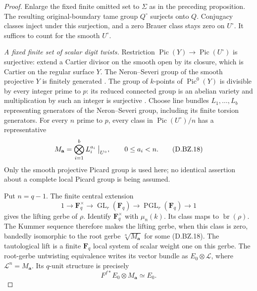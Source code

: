 \begin{proof}
Enlarge the fixed finite omitted set to $\Sigma$
as in the preceding proposition.  The resulting
original-boundary tame group $Q^\circ$ surjects
onto $Q$.  Conjugacy classes inject under this
surjection, and a zero Brauer class stays zero
on $U^\circ$.  It suffices to count for the
smooth $U^\circ$.

\emph{A fixed finite set of scalar digit twists.}
Restriction $\operatorname{Pic}(Y)\to
\operatorname{Pic}(U^\circ)$ is surjective:
extend a Cartier divisor on the smooth open
by its closure, which is Cartier on the
regular surface $Y$.  The Neron--Severi
group of the smooth projective $Y$ is
finitely generated
\citep[Expose XIII, Theorem~5.1 and proof,
printed pp.~650--651]{SGA6BrauerZeroD}.
The group of $k$-points of $\operatorname{Pic}^0(Y)$
is divisible by every integer prime to $p$:
its reduced connected group is an abelian
variety and multiplication by such an integer
is surjective
\citep[Proposition~39.9.11(3)--(4), Tag 03RP;
Lemma~39.9.8 and proof, Tag 0BFG]{StacksBrauerZeroD}.
Choose line bundles
$L_1,\ldots,L_b$ representing generators
of the Neron--Severi group, including its
finite torsion generators.  For every
$n$ prime to $p$, every class in
$\operatorname{Pic}(U^\circ)/n$ has a
representative
\[
          M_{\mathbf a}=\bigotimes_{i=1}^b L_i^{a_i}
                         \bigm|_{U^\circ},
               \qquad 0\le a_i<n.                       \tag{D.BZ.18}
\]
Only the smooth projective Picard group is used
here; no identical assertion about a complete
local Picard group is being assumed.

Put $n=q-1$.  The finite central extension
\[
 1\longrightarrow\mathbf F_q^\times
  \longrightarrow\operatorname{GL}_r(\mathbf F_q)
  \longrightarrow\operatorname{PGL}_r(\mathbf F_q)
  \longrightarrow1
                                                        \tag{D.BZ.19}
\]
gives the lifting gerbe of $\rho$.
Identify $\mathbf F_q^\times$ with $\mu_n(k)$.
Its class maps to $\operatorname{br}(\rho)$.
The Kummer sequence
\citep[Lemma~59.28.1, Tag 03PK]{StacksBrauerZeroD}
therefore makes the
lifting gerbe, when this class is zero,
bandedly isomorphic to the root gerbe
$\sqrt[n]{M_{\mathbf a}}$ for some
(D.BZ.18).  The tautological lift is a
finite $\mathbf F_q$ local system of
scalar weight one on this gerbe.
The root-gerbe untwisting equivalence
\citep[Sections~2.2.2 and 3.1.1;
Lemmas~3.1.1.7--3.1.1.8 and
3.1.1.11--3.1.1.12]{Lieblich2008BrauerZeroD}
writes its vector bundle as
$E_0\otimes\mathcal L$, where
$\mathcal L^n=M_{\mathbf a}$.
Its $q$-unit structure is precisely
\[
                 F^{f*}E_0\otimes M_{\mathbf a}
                                  \simeq E_0.           \tag{D.BZ.20}
\]


\end{proof}
